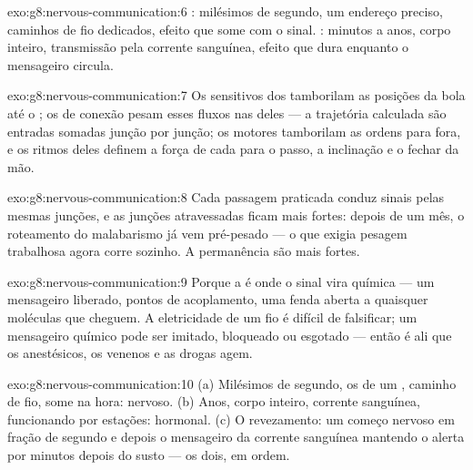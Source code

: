 \begin{solution}{exo:g8:nervous-communication:6}
: milésimos de segundo, um endereço preciso, caminhos de fio
dedicados, efeito que some com o sinal. : minutos a anos,
corpo inteiro, transmissão pela corrente sanguínea, efeito que dura
enquanto o mensageiro circula.
\end{solution}

\begin{solution}{exo:g8:nervous-communication:7}
Os  sensitivos dos  tamborilam as posições da bola até o
; os  de conexão pesam esses fluxos nas  deles
--- a trajetória calculada são entradas somadas junção por junção; os
 motores tamborilam as ordens para fora, e os ritmos deles
definem a força de cada  para o passo, a inclinação e o fechar
da mão.
\end{solution}

\begin{solution}{exo:g8:nervous-communication:8}
Cada passagem praticada conduz sinais pelas mesmas junções, e as
junções atravessadas ficam mais fortes: depois de um mês, o roteamento
do malabarismo já vem pré-pesado --- o que exigia pesagem trabalhosa
agora corre sozinho. A permanência são  mais fortes.
\end{solution}

\begin{solution}{exo:g8:nervous-communication:9}
Porque a  é onde o sinal vira química --- um mensageiro
liberado, pontos de acoplamento, uma fenda aberta a quaisquer
moléculas que cheguem. A eletricidade de um fio é difícil de
falsificar; um mensageiro químico pode ser imitado, bloqueado ou
esgotado --- então é ali que os anestésicos, os venenos e as drogas
agem.
\end{solution}

\begin{solution}{exo:g8:nervous-communication:10}
(a) Milésimos de segundo, os  de um , caminho de fio,
some na hora: nervoso. (b) Anos, corpo inteiro, corrente sanguínea,
funcionando por estações: hormonal. (c) O revezamento: um começo
nervoso em fração de segundo e depois o mensageiro da corrente
sanguínea mantendo o alerta por minutos depois do susto --- os dois, em
ordem.
\end{solution}

